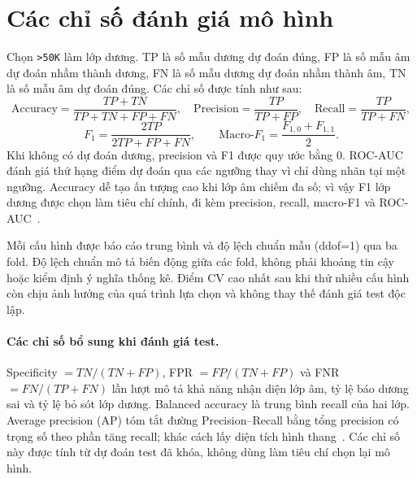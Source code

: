 \section{Các chỉ số đánh giá mô hình}
\label{sec:2_6}
Chọn \texttt{>50K} làm lớp dương. TP là số mẫu dương dự đoán đúng, FP là số mẫu âm dự đoán nhầm thành dương, FN là số mẫu dương dự đoán nhầm thành âm, TN là số mẫu âm dự đoán đúng. Các chỉ số được tính như sau:
\[
\mathrm{Accuracy}=\frac{TP+TN}{TP+TN+FP+FN},\quad
\mathrm{Precision}=\frac{TP}{TP+FP},\quad
\mathrm{Recall}=\frac{TP}{TP+FN},
\]
\[
F_1=\frac{2TP}{2TP+FP+FN},\qquad
\mathrm{Macro\text{-}}F_1=\frac{F_{1,0}+F_{1,1}}{2}.
\]
Khi không có dự đoán dương, precision và F1 được quy ước bằng 0. ROC-AUC đánh giá thứ hạng điểm dự đoán qua các ngưỡng thay vì chỉ dùng nhãn tại một ngưỡng. Accuracy dễ tạo ấn tượng cao khi lớp âm chiếm đa số; vì vậy F1 lớp dương được chọn làm tiêu chí chính, đi kèm precision, recall, macro-F1 và ROC-AUC~\cite{sklearn-f1}.

Mỗi cấu hình được báo cáo trung bình và độ lệch chuẩn mẫu (ddof=1) qua ba fold. Độ lệch chuẩn mô tả biến động giữa các fold, không phải khoảng tin cậy hoặc kiểm định ý nghĩa thống kê. Điểm CV cao nhất sau khi thử nhiều cấu hình còn chịu ảnh hưởng của quá trình lựa chọn và không thay thế đánh giá test độc lập.

\paragraph{Các chỉ số bổ sung khi đánh giá test.}\label{sec:metric-specificity-ap}
Specificity $=TN/(TN+FP)$, FPR $=FP/(TN+FP)$ và FNR $=FN/(TP+FN)$ lần lượt mô tả khả năng nhận diện lớp âm, tỷ lệ báo dương sai và tỷ lệ bỏ sót lớp dương. Balanced accuracy là trung bình recall của hai lớp. Average precision (AP) tóm tắt đường Precision--Recall bằng tổng precision có trọng số theo phần tăng recall; khác cách lấy diện tích hình thang~\cite{sklearn-ap}. Các chỉ số này được tính từ dự đoán test đã khóa, không dùng làm tiêu chí chọn lại mô hình.
